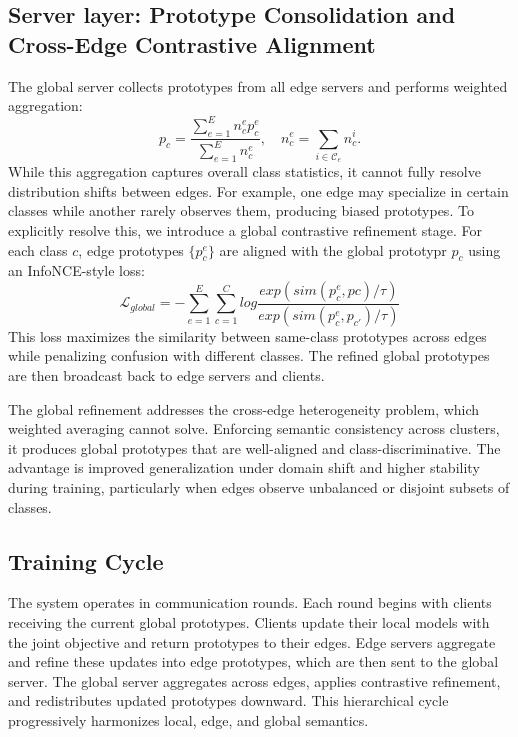 \documentclass[twoside]{article}
\begin{document}
    \subsection{Server layer: Prototype Consolidation and Cross-Edge Contrastive Alignment}
        The global server collects prototypes from all edge servers and performs weighted aggregation:
        \begin{equation}
            p_c = \frac{\sum_{e=1}^E n_c^e p_c^e}{\sum_{e=1}^E n_c^e}, \quad n_c^e=\sum_{i\in \mathcal{C}_e} n_c^i.
        \end{equation}
        While this aggregation captures overall class statistics, it cannot fully resolve distribution shifts between edges. For example, one edge may specialize in certain classes while another rarely observes them, producing biased prototypes. To explicitly resolve this, we introduce a global contrastive refinement stage. For each class $c$, edge prototypes $\{p_c^e\}$ are aligned with the global prototypr $p_c$ using an InfoNCE-style loss:
        \begin{equation}
            \mathcal{L}_{global} = - \sum_{e=1}^E \sum_{c=1}^C log\frac{exp(sim(p_c^e, pc)/\tau)}{exp(sim(p_c^e, p_{c'})/\tau)}
        \end{equation}
        This loss maximizes the similarity between same-class prototypes across edges while penalizing confusion with different classes. The refined global prototypes are then broadcast back to edge servers and clients.

        The global refinement addresses the cross-edge heterogeneity problem, which weighted averaging cannot solve. Enforcing semantic consistency across clusters, it produces global prototypes that are well-aligned and class-discriminative. The advantage is improved generalization under domain shift and higher stability during training, particularly when edges observe unbalanced or disjoint subsets of classes.

    \subsection{Training Cycle}
        The system operates in communication rounds. Each round begins with clients receiving the current global prototypes. Clients update their local models with the joint objective and return prototypes to their edges. Edge servers aggregate and refine these updates into edge prototypes, which are then sent to the global server. The global server aggregates across edges, applies contrastive refinement, and redistributes updated prototypes downward. This hierarchical cycle progressively harmonizes local, edge, and global semantics.
\end{document}
